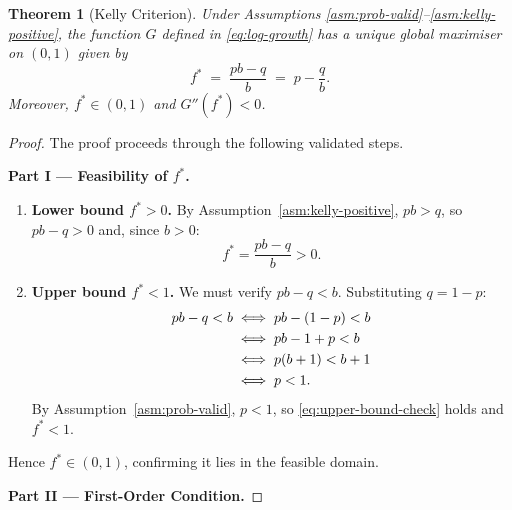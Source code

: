 \documentclass[12pt,openany]{book}
\numberwithin{equation}{chapter}
\theoremstyle{plain}
\newtheorem{theorem}{Theorem}[chapter]
\theoremstyle{definition}
\theoremstyle{remark}
\numberwithin{equation}{chapter}
\theoremstyle{plain}
\begin{document}
\begin{theorem}[Kelly Criterion]
\label{thm:kelly}
Under Assumptions \ref{asm:prob-valid}--\ref{asm:kelly-positive},
the function $G$ defined in \eqref{eq:log-growth} has a unique global
maximiser on $(0, 1)$ given by
\begin{equation}
  f^{*} \;=\; \frac{pb - q}{b} \;=\; p - \frac{q}{b}.
  \label{eq:kelly}
\end{equation}
Moreover, $f^{*} \in (0, 1)$ and $G''(f^{*}) < 0$.
\end{theorem}

\begin{proof}
The proof proceeds through the following validated steps.

\medskip
\noindent\textbf{Part I --- Feasibility of $f^{*}$.}

\begin{enumerate}[label=\textbf{Step \arabic*.}, leftmargin=*, widest=Step 9]

  \item \textbf{Lower bound $f^{*} > 0$.}
        By Assumption~\ref{asm:kelly-positive}, $pb > q$, so
        $pb - q > 0$ and, since $b > 0$:
        \begin{equation}
          f^{*} = \frac{pb - q}{b} > 0.
        \end{equation}

  \item \textbf{Upper bound $f^{*} < 1$.}
        We must verify $pb - q < b$.  Substituting $q = 1 - p$:
        \begin{align}
          pb - q < b
          &\;\Longleftrightarrow\; pb - (1 - p) < b \notag \\
          &\;\Longleftrightarrow\; pb - 1 + p < b \notag \\
          &\;\Longleftrightarrow\; p(b + 1) < b + 1 \notag \\
          &\;\Longleftrightarrow\; p < 1. \label{eq:upper-bound-check}
        \end{align}
        By Assumption~\ref{asm:prob-valid}, $p < 1$, so
        \eqref{eq:upper-bound-check} holds and $f^{*} < 1$.

\end{enumerate}

\noindent Hence $f^{*} \in (0, 1)$, confirming it lies in the feasible
domain.

\medskip
\noindent\textbf{Part II --- First-Order Condition.}


\end{proof}
\end{document}
